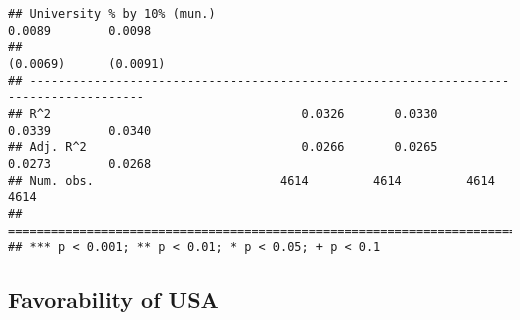 \documentclass[
]{article}
\begin{document}
\begin{verbatim}
## University % by 10% (mun.)                                      0.0089        0.0098  
##                                                                (0.0069)      (0.0091) 
## --------------------------------------------------------------------------------------
## R^2                                   0.0326       0.0330       0.0339        0.0340  
## Adj. R^2                              0.0266       0.0265       0.0273        0.0268  
## Num. obs.                          4614         4614         4614          4614       
## ======================================================================================
## *** p < 0.001; ** p < 0.01; * p < 0.05; + p < 0.1
\end{verbatim}

\hypertarget{favorability-of-usa-1}{%
\subsection{Favorability of USA}\label{favorability-of-usa-1}}
\end{document}
